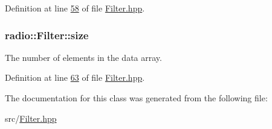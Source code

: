 Definition at line \hyperlink{Filter_8hpp_source_l00058}{58} of file \hyperlink{Filter_8hpp_source}{Filter.\+hpp}.

\hypertarget{classradio_1_1Filter_a7285b4c7263d8278e38abb14b5dca5d9}{
\subsubsection[{size}]{ radio\+::\+Filter\+::size\hspace{0.3cm}{\ttfamily [protected]}}}\label{classradio_1_1Filter_a7285b4c7263d8278e38abb14b5dca5d9}
The number of elements in the data array. 

Definition at line \hyperlink{Filter_8hpp_source_l00063}{63} of file \hyperlink{Filter_8hpp_source}{Filter.\+hpp}.



The documentation for this class was generated from the following file\+:\begin{DoxyCompactItemize}
\item 
src/\hyperlink{Filter_8hpp}{Filter.\+hpp}\end{DoxyCompactItemize}
